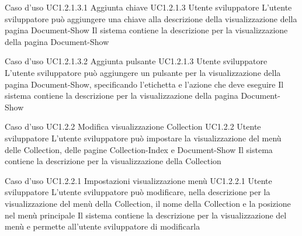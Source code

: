 \UCtitle
{Caso d'uso UC1.2.1.3.1}
{Aggiunta chiave}
\UC
{UC1.2.1.3}
{Utente sviluppatore}
{L'utente sviluppatore  può aggiungere una chiave alla descrizione della visualizzazione della pagina Document-Show}
{Il sistema contiene la descrizione per la visualizzazione della pagina Document-Show}

\UCtitle
{Caso d'uso UC1.2.1.3.2}
{Aggiunta pulsante}
\UC
{UC1.2.1.3}
{Utente sviluppatore}
{L'utente sviluppatore può aggiungere un pulsante per la visualizzazione della pagina Document-Show, specificando l'etichetta e l'azione che deve eseguire}
{Il sistema contiene la descrizione per la visualizzazione della pagina Document-Show}


\UCtitle
{Caso d'uso UC1.2.2}
{Modifica visualizzazione Collection}
\UC
{UC1.2.2}
{Utente sviluppatore}
{L'utente sviluppatore  può impostare la visualizzazione del menù delle Collection, delle pagine Collection-Index e Document-Show}
{Il sistema contiene la descrizione per la visualizzazione della Collection}

\UCtitle
{Caso d'uso UC1.2.2.1}
{Impostazioni visualizzazione menù}
\UC
{UC1.2.2.1}
{Utente sviluppatore}
{L'utente sviluppatore può modificare, nella descrizione per la visualizzazione del menù della Collection, il nome della Collection e la posizione nel menù principale}
{Il sistema contiene la descrizione per la visualizzazione del menù e permette all'utente sviluppatore di modificarla}


